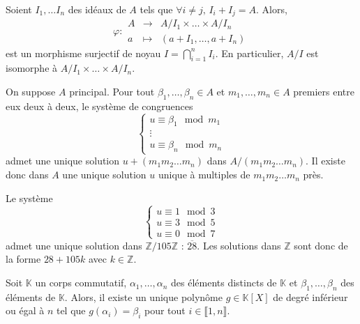 	\begin{theorem}
		Soient $I_1, \dots I_n$ des idéaux de $A$ tels que $\forall i \neq j, \, I_i + I_j = A$. Alors,
		\[
			\varphi :
			\begin{array}{ccc}
				A &\rightarrow& A/I_1 \times \dots \times A/I_n \\
				a &\mapsto& (a + I_1, \dots, a + I_n)
			\end{array}
		\]
		est un morphisme surjectif de noyau $I = \bigcap_{i=1}^n I_i$. En particulier, $A/I$ est isomorphe à $A/I_1 \times \dots \times A/I_n$.
	\end{theorem}

	\begin{corollary}
		On suppose $A$ principal. Pour tout $\beta_1, \dots, \beta_n \in A$ et $m_1, \dots, m_n \in A$ premiers entre eux deux à deux, le système de congruences
		\[
			\begin{cases}
				u \equiv \beta_1 \mod m_1 \\
				\vdots \\
				u \equiv \beta_n \mod m_n
			\end{cases}
		\]
		admet une unique solution $u + (m_1 m_2 \dots m_n)$ dans $A / (m_1 m_2 \dots m_n)$. Il existe donc dans $A$ une unique solution $u$ unique à multiples de $m_1 m_2 \dots m_n$ près.
	\end{corollary}

	\begin{example}
		Le système
		\[
			\begin{cases}
				u \equiv 1 \mod 3 \\
				u \equiv 3 \mod 5 \\
				u \equiv 0 \mod 7
			\end{cases}
		\]
		admet une unique solution dans $\mathbb{Z}/105\mathbb{Z}$ : $\overline{28}$. Les solutions dans $\mathbb{Z}$ sont donc de la forme $28 + 105k$ avec $k \in \mathbb{Z}$.
	\end{example}

	\begin{application}
		Soit $\mathbb{K}$ un corps commutatif, $\alpha_1, \dots, \alpha_n$ des éléments distincts de $\mathbb{K}$ et $\beta_1, \dots, \beta_n$ des éléments de $\mathbb{K}$. Alors, il existe un unique polynôme $g \in \mathbb{K}[X]$ de degré inférieur ou égal à $n$ tel que $g(\alpha_i) = \beta_i$ pour tout $i \in \llbracket 1, n \rrbracket$.
	\end{application}

